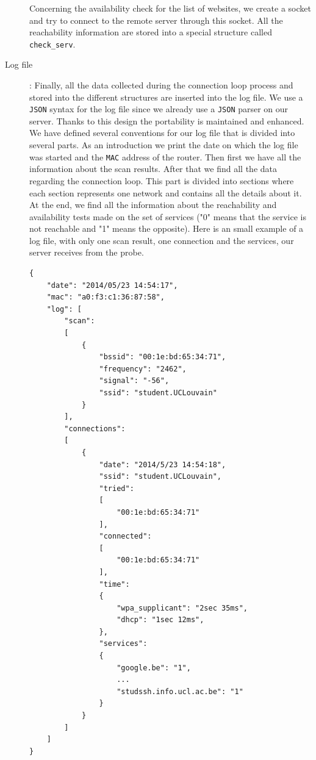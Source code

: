 \begin{description}
	Concerning the availability check for the list of websites, we create a socket and try to connect to the remote server through this socket. All the reachability information are stored into a special structure called \texttt{check\_serv}.

	\item[Log file]: Finally, all the data collected during the connection loop process and stored into the different structures are inserted into the log file. We use a \texttt{JSON} syntax for the log file since we already use a \texttt{JSON} parser on our server. Thanks to this design the portability is maintained and enhanced. We have defined several conventions for our log file that is divided into several parts. As an introduction we print the date on which the log file was started and the \texttt{MAC} address of the router. Then first we have all the information about the scan results. After that we find all the data regarding the connection loop. This part is divided into sections where each section represents one network and contains all the details about it. At the end, we find all the information about the reachability and availability tests made on the set of services ("0" means that the service is not reachable and "1" means the opposite). Here is an small example of a log file, with only one scan result, one connection and the services, our server receives from the probe.\\


\begin{lstlisting}[frame=single,breaklines=true,caption={Small log file example}]
{
	"date": "2014/05/23 14:54:17",
	"mac": "a0:f3:c1:36:87:58",
	"log": [
		"scan": 
		[
			{
				"bssid": "00:1e:bd:65:34:71",
				"frequency": "2462",
				"signal": "-56",
				"ssid": "student.UCLouvain"
			}
		],
		"connections": 
		[
			{
				"date": "2014/5/23 14:54:18",
				"ssid": "student.UCLouvain",
				"tried": 
				[ 
					"00:1e:bd:65:34:71"
				],
				"connected": 
				[ 
					"00:1e:bd:65:34:71"
				],
				"time": 
				{
					"wpa_supplicant": "2sec 35ms",
					"dhcp": "1sec 12ms",
				},
				"services":
				{
					"google.be": "1",
					...
					"studssh.info.ucl.ac.be": "1"
				}
			}
		]
	]
}
	\end{lstlisting}
\end{description}


